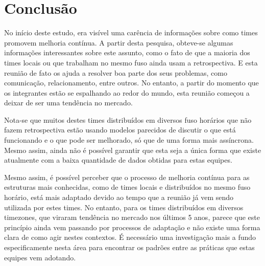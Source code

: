 \documentclass[12pt]{article}
\begin{document}
\section{Conclusão}

No início deste estudo, era visível uma carência de informações sobre como times promovem melhoria contínua. A partir desta pesquisa, obteve-se algumas informações interessantes sobre este assunto, como o fato de que a maioria dos times locais ou que trabalham no mesmo fuso ainda usam a retrospectiva. E esta reunião de fato os ajuda a resolver boa parte dos seus problemas, como comunicação, relacionamento, entre outros. No entanto, a partir do momento que os integrantes estão se espalhando ao redor do mundo, esta reunião começou a deixar de ser uma tendência no mercado.

Nota-se que muitos destes times distribuídos em diversos fuso horários que não fazem retrospectiva estão usando modelos parecidos de discutir o que está funcionando e o que pode ser melhorado, só que de uma forma mais assíncrona. Mesmo assim, ainda não é possível garantir que esta seja a única forma que existe atualmente com a baixa quantidade de dados obtidas para estas equipes.

Mesmo assim, é possível perceber que o processo de melhoria contínua para as estruturas mais conhecidas, como de times locais e distribuídos no mesmo fuso horário, está mais adaptado devido ao tempo que a reunião já vem sendo utilizada por estes times. No entanto, para os times distribuídos em diversos timezones, que viraram tendência no mercado nos últimos 5 anos, parece que este princípio ainda vem passando por processos de adaptação e não existe uma forma clara de como agir nestes contextos. É necessário uma investigação mais a fundo especificamente nesta área para encontrar os padrões entre as práticas que estas equipes vem adotando.



\end{document}

